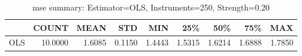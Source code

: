 \begin{table}[ht]
\centering
\caption{mse summary: Estimator=OLS, Instruments=250, Strength=0.20}
\begin{tabular}{lrrrrrrrr}
\toprule
 & COUNT & MEAN & STD & MIN & 25\% & 50\% & 75\% & MAX \\
\midrule
OLS & 10.0000 & 1.6085 & 0.1150 & 1.4443 & 1.5315 & 1.6214 & 1.6888 & 1.7850 \\
\bottomrule
\end{tabular}
\end{table}
